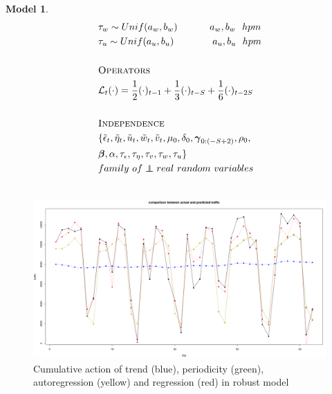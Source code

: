 \documentclass[11pt,twoside]{report}
\newcommand\independent{\protect\mathpalette{\protect\independenT}{\perp}}
\def\independenT#1#2{\mathrel{\rlap{$#1#2$}\mkern2mu{#1#2}}}
\newtheorem{model}{Model}
\begin{document}
\begin{model}
\begin{equation*}
\begin{aligned}[c]
	&\tau_w\sim Unif(a_w, b_w)\quad\quad\quad\ a_w, b_w\ \ hpm\\
	&\tau_u \sim Unif(a_u, b_u)\quad\quad\quad\quad a_u, b_u\ \ hpm\\
	&\\
	&\textsc{Operators}\\
	&\mathcal{L}_t(\cdot) = \frac{1}{2}(\cdot)_{t-1} + \frac{1}{3}(\cdot)_{t-S} +\frac{1}{6}(\cdot)_{t-2S}\\
	&\\
	&\textsc{Independence}\\
	&\{\tilde{\epsilon}_t, \tilde{\eta}_t, \tilde{u}_t, \tilde{w}_t, \tilde{v}_t, \mu_0, \delta_0, \boldsymbol{\gamma}_{0:(-S+2)}, \rho_0,\\ &\boldsymbol{\beta}, \alpha, \tau_\epsilon, \tau_\eta, \tau_v, \tau_w, \tau_u\}\\ &family\ of \independent real\ random\ variables\\
	&\\
	\end{aligned}
	\end{equation*}
\end{model}
\begin{figure}[H]
	\centering
	\includegraphics[width=150 mm]{pictures/m4_p1.png}
	\caption{Cumulative action of trend (blue), periodicity (green), autoregression (yellow) and regression (red) in robust model}
	\label{fig:M4_p1}
\end{figure}
\end{document}
